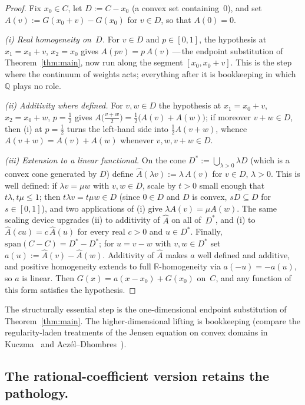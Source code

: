 \documentclass{article}
\theoremstyle{plain}
\theoremstyle{definition}
\newcommand{\R}{\mathbb{R}}
\newcommand{\Q}{\mathbb{Q}}
\begin{document}
\begin{proof}
Fix $x_0\in C$, let $D:=C-x_0$ (a convex set containing~$0$), and set
$A(v):=G(x_0+v)-G(x_0)$ for $v\in D$, so that $A(0)=0$.

\emph{(i) Real homogeneity on~$D$.} For $v\in D$ and $p\in[0,1]$, the
hypothesis at $x_1=x_0+v$, $x_2=x_0$ gives $A(pv)=p\,A(v)$\,---\,the
endpoint substitution of Theorem~\ref{thm:main}, now run along the
segment $[x_0,x_0+v]$. This is the step where the continuum of weights
acts; everything after it is bookkeeping in which $\Q$ plays no role.

\emph{(ii) Additivity where defined.} For $v,w\in D$ the hypothesis at
$x_1=x_0+v$, $x_2=x_0+w$, $p=\tfrac12$ gives
$A\bigl(\tfrac{v+w}{2}\bigr)=\tfrac12\bigl(A(v)+A(w)\bigr)$; if
moreover $v+w\in D$, then (i) at $p=\tfrac12$ turns the left-hand side
into $\tfrac12 A(v+w)$, whence $A(v+w)=A(v)+A(w)$ whenever
$v,w,v+w\in D$.

\emph{(iii) Extension to a linear functional.} On the cone
$D^{\ast}:=\bigcup_{\lambda>0}\lambda D$ (which is a convex cone generated
by $D$) define $\hat A(\lambda v):=\lambda\,A(v)$ for $v\in D$, $\lambda>0$. This is
well defined: if $\lambda v=\mu w$ with $v,w\in D$, scale by $t>0$
small enough that $t\lambda,t\mu\le1$; then $t\lambda v=t\mu w\in D$
(since $0\in D$ and $D$ is convex, $sD\subseteq D$ for $s\in[0,1]$),
and two applications of (i) give $\lambda A(v)=\mu A(w)$. The same
scaling device upgrades (ii) to additivity of $\hat A$ on all
of~$D^{\ast}$, and (i) to $\hat A(cu)=c\,\hat A(u)$ for every real
$c>0$ and $u\in D^{\ast}$. Finally,
$\mathrm{span}(C-C)=D^{\ast}-D^{\ast}$; for $u=v-w$ with
$v,w\in D^{\ast}$ set $a(u):=\hat A(v)-\hat A(w)$. Additivity of
$\hat A$ makes $a$ well defined and additive, and positive homogeneity
extends to full $\R$-homogeneity via $a(-u)=-a(u)$, so $a$ is linear.
Then $G(x)=a(x-x_0)+G(x_0)$ on~$C$, and any function of this form
satisfies the hypothesis.
\end{proof}

The structurally essential step is the one-dimensional endpoint substitution
of Theorem~\ref{thm:main}. The higher-dimensional lifting is
bookkeeping (compare the regularity-laden treatments of the Jensen
equation on convex domains in Kuczma~\cite[\S13.2]{Kuczma2009} and
Acz\'el--Dhombres~\cite{AczelDhombres1989}).

\subsection{The rational-coefficient version retains the pathology.}
\label{ssec:JQ-pathology}
\end{document}
